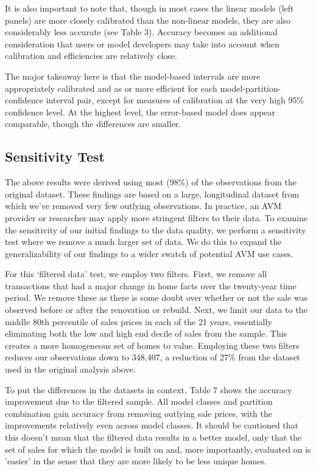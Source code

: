 \documentclass[colTwo]{anon}
\theoremstyle{definition}
\begin{document}
It is also important to note that, though in most cases the linear models (left panels) are more closely calibrated than the non-linear models, they are also considerably less accurate (see Table 3).  Accuracy becomes an additional consideration that users or model developers may take into account when calibration and efficiencies are relatively close.

The major takeaway here is that the model-based intervals are more appropriately calibrated and as or more efficient for each model-partition-confidence interval pair, except for measures of calibration at the very high 95\% confidence level.  At the highest level, the error-based model does appear comparable, though the differences are smaller.

\subsection{Sensitivity Test}

The above results were derived using most (98\%) of the observations from the original dataset. These findings are based on a large, longitudinal dataset from which we’ve removed very few outlying observations. In practice, an AVM provider or researcher may apply more stringent filters to their data. To examine the sensitivity of our initial findings to the data quality, we perform a sensitivity test where we remove a much larger set of data. We do this to expand the generalizability of our findings to a wider swatch of potential AVM use cases.

For this ‘filtered data’ test, we employ two filters.  First, we remove all transactions that had a major change in home facts over the twenty-year time period.  We remove these as there is some doubt over whether or not the sale was observed before or after the renovation or rebuild. Next, we limit our data to the middle 80th percentile of sales prices in each of the 21 years, essentially eliminating both the low and high end decile of sales from the sample.  This creates a more homogeneous set of homes to value.  Employing these two filters reduces our observations down to 348,407, a reduction of 27\% from the dataset used in the original analysis above.

To put the differences in the datasets in context, Table 7 shows the accuracy improvement due to the filtered sample.  All model classes and partition combination gain accuracy from removing outlying sale prices, with the improvements relatively even across model classes. It should be cautioned that this doesn't mean that the filtered data results in a better model, only that the set of sales for which the model is built on and, more importantly, evaluated on is 'easier' in the sense that they are more likely to be less unique homes.
\end{document}
